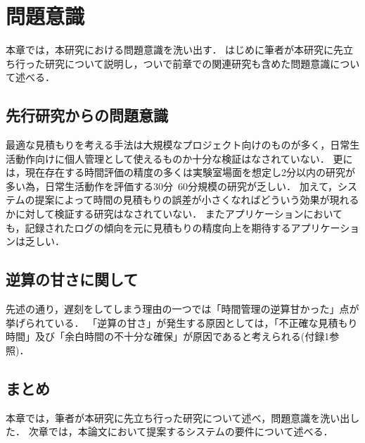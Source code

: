 \chapter{問題意識}
本章では，本研究における問題意識を洗い出す．
はじめに筆者が本研究に先立ち行った研究について説明し，ついで前章での関連研究も含めた問題意識について述べる．

\section{先行研究からの問題意識}
最適な見積もりを考える手法は大規模なプロジェクト向けのものが多く，日常生活動作向けに個人管理として使えるものか十分な検証はなされていない．
更には，現在存在する時間評価の精度の多くは実験室場面を想定し2分以内の研究が多い為，日常生活動作を評価する30分~60分規模の研究が乏しい．
加えて，システムの提案によって時間の見積もりの誤差が小さくなればどういう効果が現れるかに対して検証する研究はなされていない．
またアプリケーションにおいても，記録されたログの傾向を元に見積もりの精度向上を期待するアプリケーションは乏しい．

\section{逆算の甘さに関して}
先述の通り，遅刻をしてしまう理由の一つでは「時間管理の逆算甘かった」点が挙げられている．%
「逆算の甘さ」が発生する原因としては，「不正確な見積もり時間」及び「余白時間の不十分な確保」が原因であると考えられる(付録1参照)．

\section{まとめ}
本章では，筆者が本研究に先立ち行った研究について述べ，問題意識を洗い出した．
次章では，本論文において提案するシステムの要件について述べる．